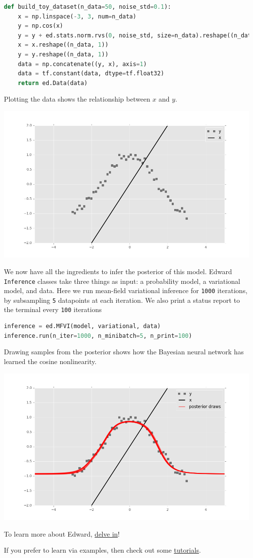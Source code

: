 \begin{lstlisting}[language=Python]
def build_toy_dataset(n_data=50, noise_std=0.1):
    x = np.linspace(-3, 3, num=n_data)
    y = np.cos(x) 
    y = y + ed.stats.norm.rvs(0, noise_std, size=n_data).reshape((n_data,))
    x = x.reshape((n_data, 1))
    y = y.reshape((n_data, 1))
    data = np.concatenate((y, x), axis=1)
    data = tf.constant(data, dtype=tf.float32)
    return ed.Data(data)  
\end{lstlisting}

Plotting the data shows the relationship between $x$ and $y$.

\includegraphics[width=700px]{images/getting-started-fig0.png}

We now have all the ingredients to infer the posterior of this model. 
Edward \texttt{Inference} classes take three things as input: a
probability model, a variational model, and data. Here we run mean-field
variational inference for \texttt{1000} iterations, by subsampling \texttt{5}
datapoints at each
iteration. We also print a status report to the terminal every \texttt{100}
iterations
\begin{lstlisting}[language=Python]
inference = ed.MFVI(model, variational, data)
inference.run(n_iter=1000, n_minibatch=5, n_print=100)  
\end{lstlisting}

Drawing samples from the posterior shows how the Bayesian neural network has
learned the cosine nonlinearity. 

\includegraphics[width=700px]{images/getting-started-fig2.png}

To learn more about Edward, \href{delving-in.html}{delve in}!

If you prefer to learn via examples, then check out some  
\href{tutorials.html}{tutorials}.
